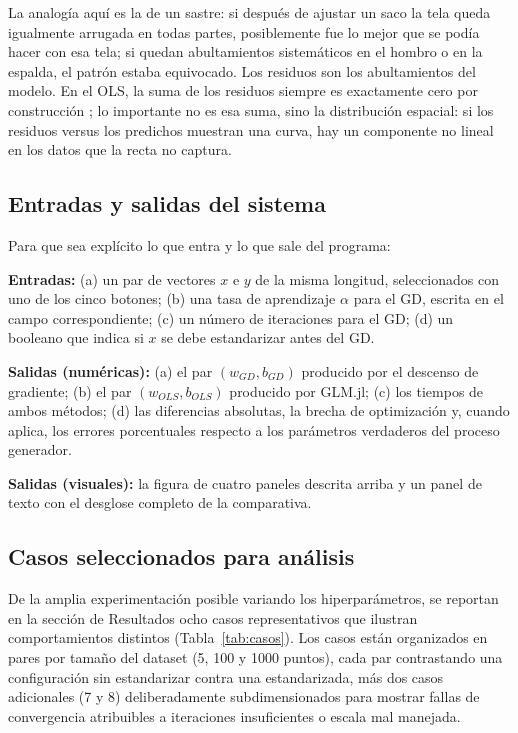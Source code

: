 \documentclass[11pt,a4paper]{article}
\begin{document}
La analogía aquí es la de un sastre: si después de ajustar un saco la tela queda igualmente arrugada en todas partes, posiblemente fue lo mejor que se podía hacer con esa tela; si quedan abultamientos sistemáticos en el hombro o en la espalda, el patrón estaba equivocado. Los residuos son los abultamientos del modelo. En el OLS, la suma de los residuos siempre es exactamente cero por construcción \cite{unican_regresion}; lo importante no es esa suma, sino la distribución espacial: si los residuos versus los predichos muestran una curva, hay un componente no lineal en los datos que la recta no captura.

\subsection{Entradas y salidas del sistema}

Para que sea explícito lo que entra y lo que sale del programa:

\textbf{Entradas:} (a) un par de vectores $x$ e $y$ de la misma longitud, seleccionados con uno de los cinco botones; (b) una tasa de aprendizaje $\alpha$ para el GD, escrita en el campo correspondiente; (c) un número de iteraciones para el GD; (d) un booleano que indica si $x$ se debe estandarizar antes del GD.

\textbf{Salidas (numéricas):} (a) el par $(w_{GD}, b_{GD})$ producido por el descenso de gradiente; (b) el par $(w_{OLS}, b_{OLS})$ producido por GLM.jl; (c) los tiempos de ambos métodos; (d) las diferencias absolutas, la brecha de optimización y, cuando aplica, los errores porcentuales respecto a los parámetros verdaderos del proceso generador.

\textbf{Salidas (visuales):} la figura de cuatro paneles descrita arriba y un panel de texto con el desglose completo de la comparativa.

\subsection{Casos seleccionados para análisis}

De la amplia experimentación posible variando los hiperparámetros, se reportan en la sección de Resultados ocho casos representativos que ilustran comportamientos distintos (Tabla~\ref{tab:casos}). Los casos están organizados en pares por tamaño del dataset (5, 100 y 1000 puntos), cada par contrastando una configuración sin estandarizar contra una estandarizada, más dos casos adicionales (7 y 8) deliberadamente subdimensionados para mostrar fallas de convergencia atribuibles a iteraciones insuficientes o escala mal manejada.
\end{document}
